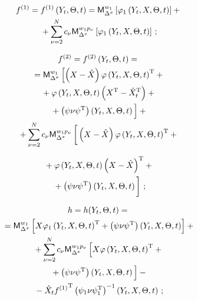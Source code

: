 \begin{multicols}{2}
\vspace*{-12pt}

\noindent
\begin{multline}
f^{(1)}= f^{(1)}\left(Y_t,\Theta,t\right) = 
{\sf M}_{\Delta^x}^{w_1}\left[ \varphi_1\left(Y_t, X, \Theta,t\right)\right] + {}\\
{}+
\sum\limits_{\nu=2}^N c_\nu {\sf M}_{\Delta^x}^{w_1p_\nu }\left[ \varphi_1  
\left(Y_t, X,\Theta,t\right)\right]\,;
\label{e5.28-s1}
\end{multline}

\vspace*{-12pt}

\noindent
\begin{multline*}
f^{(2)}= f^{(2)}\left(Y_t,\Theta,t\right) ={}\\
{}= \mm_{\Delta^x}^{w_1}\left[ \left(X-\hx\right)\varphi
\left(Y_t, X,\Theta, t\right)^{\mathrm{T}}+{}\right.\\
{}+
    \varphi\left(Y_t,X,\Theta,t\right) \left(X^{\mathrm{T}}-\hx_t^{\mathrm{T}}
    \right)+{}\\
      \left.{}+
    \left(\psi\nu\psi^{\mathrm{T}}\right) \left(Y_t,X,\Theta,t\right)
    \vphantom{\left(Y_t, X,\Theta, t\right)^{\mathrm{T}}}
    \right]+{}\\
{}+\sss_{\nu=2}^N c_\nu \mm_{\Delta^x}^{w_1p_\nu}\left[ 
\vphantom{\left(X-\hx\right)^{\mathrm{T}}}
\left(X-\hx\right)\vrp\left(Y_t, X,\Theta,t\right)^{\mathrm{T}}+ {}\right.
    \end{multline*}
    
    \noindent
\begin{multline}
  {}+
\vrp\left(Y_t, X,\Theta, t\right) \left(X-\hx\right)^{\mathrm{T}} + {}\\
\left.{}+
\left(\psi\nu\psi^{\mathrm{T}}\right) \left(Y_t, X,\Theta, t\right) 
\vphantom{\left(X-\hx\right)^{\mathrm{T}}}
\right]\,;
\label{e5.29-s1}
\end{multline}

\vspace*{-12pt}

\noindent
\begin{multline}
h= h(Y_t,\Theta,t) ={}\\
{}=\mm_{\Delta^x}^{w_1}\left[ X\varphi_1
\left(Y_t, X,\Theta, t\right)^{\mathrm{T}} + 
\left(\psi\nu\psi^{\mathrm{T}}\right)\left(Y_t,X,\Theta,t\right)\right]+{}\\
{}+\sss_{\nu=2}^N c_\nu \mm_{\Delta^x}^{w_1p_\nu} \left[ 
X\vrp\left(Y_t, X,\Theta, t\right)^{\mathrm{T}} + {}\right.\\
\left.{}+
\left(\psi\nu\psi^{\mathrm{T}}\right) \left(Y_t, X, \Theta,t\right)
\vphantom{\left(Y_t, X,\Theta, t\right)^{\mathrm{T}}}
\right]
    - {}\\
    {}-\hx_t {f^{(1)}}^{\mathrm{T}} \left(\psi_1\nu\psi_1^{\mathrm{T}}\right)^{-1} 
    \left(Y_t,X,\Theta,t\right)\,;
    \label{e5.30-s1}
    \end{multline}


\end{multicols}
